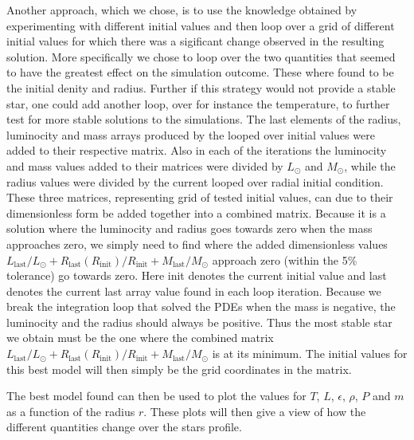 \documentclass{emulateapj}
\begin{document}
	Another approach, which we chose, is to use the knowledge obtained by experimenting with different initial values and then loop over a grid of different initial values for which there was a sigificant change observed in the resulting solution. More specifically we chose to loop over the two quantities that seemed to have the greatest effect on the simulation outcome. These where found to be the initial denity and radius. Further if this strategy would not provide a stable star, one could add another loop, over for instance the temperature, to further test for more stable solutions to the simulations. The last elements of the radius, luminocity and mass arrays produced by the looped over initial values were added to their respective matrix. Also in each of the iterations the luminocity and mass values added to their matrices were divided by $L_\odot$ and $M_\odot$, while the radius values were divided by the current looped over radial initial condition. These three matrices, representing grid of tested initial values, can due to their dimensionless form be added together into a combined matrix. Because it is a solution where the luminocity and radius goes towards zero when the mass approaches zero, we simply need to find where the added dimensionless values $L_\text{last}/L_\odot + R_\text{last}(R_\text{init})/R_\text{init} + M_\text{last}/M_\odot$ approach zero (within the 5\% tolerance) go towards zero. Here init denotes the current initial value and last denotes the current last array value found in each loop iteration. Because we break the integration loop that solved the PDEs when the mass is negative, the luminocity and the radius should always be positive. Thus the most stable star we obtain must be the one where the combined matrix $L_\text{last}/L_\odot + R_\text{last}(R_\text{init})/R_\text{init} + M_\text{last}/M_\odot$ is at its minimum. The initial values for this best model will then simply be the grid coordinates in the matrix.
	
	The best model found can then be used to plot the values for $T$, $L$, $\epsilon$, $\rho$, $P$ and $m$ as a function of the radius $r$. These plots will then give a view of how the different quantities change over the stars profile.  
	
\end{document}
